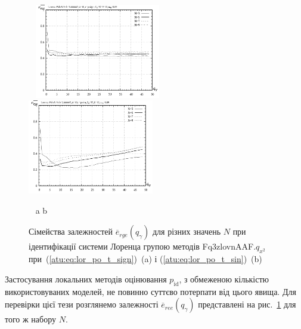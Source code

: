 \begin{figure}[ht!]
  \begin{center}
    ~ \hfill
    \includegraphics[width=0.49\textwidth]{p/cha/lor/Fq3zlovnAAF/N/lor_Fq3zlovnAAF_qx2_p_qg_e_rge_sign.png}
    \hfill
    \includegraphics[width=0.49\textwidth]{p/cha/lor/Fq3zlovnAAF/N/lor_Fq3zlovnAAF_qx2_p_qg_e_rge_sin.png}
    \hfill ~
  \end{center}
  \vspace{-1.0ex}
  \begin{center}
    ~ \hfill a \hfill\hfill b \hfill ~
  \end{center}
  \vspace{-1.5ex}
  \caption{Сімейства залежностей $ \overline{e}_{rge} (q_\gamma) $ для різних значень $ N $ при ідентифікації системи Лоренца групою методів Fq3zlovnAAF.$ q_{x^2} $ при~(\ref{atu:eq:lor_po_t_sign})~(a) і (\ref{atu:eq:lor_po_t_sin})~(b)}
\label{atu:f:lor_N_rge}
\end{figure}


Застосування локальних методів оцінювання
$ p_\mathrm{id} $, з обмеженою кількістю використовуваних моделей,
не повинно суттєво потерпати від цього явища. Для перевірки цієї тези
розглянемо залежності
$ \overline{e}_{ree} (q_\gamma) $ представлені на рис.~\ref{atu:f:lor_N_rge} для того
ж набору $ N $.

